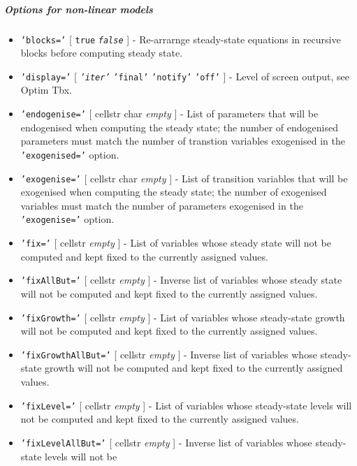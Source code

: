 \subparagraph{Options for non-linear
models}

\begin{itemize}
\item
  \texttt{'blocks='} {[} \texttt{true} \textbar{} \emph{\texttt{false}}
  {]} - Re-arrarnge steady-state equations in recursive blocks before
  computing steady state.
\item
  \texttt{'display='} {[} \emph{\texttt{'iter'}} \textbar{}
  \texttt{'final'} \textbar{} \texttt{'notify'} \textbar{}
  \texttt{'off'} {]} - Level of screen output, see Optim Tbx.
\item
  \texttt{'endogenise='} {[} cellstr \textbar{} char \textbar{}
  \emph{empty} {]} - List of parameters that will be endogenised when
  computing the steady state; the number of endogenised parameters must
  match the number of transtion variables exogenised in the
  \texttt{'exogenised='} option.
\item
  \texttt{'exogenise='} {[} cellstr \textbar{} char \textbar{}
  \emph{empty} {]} - List of transition variables that will be
  exogenised when computing the steady state; the number of exogenised
  variables must match the number of parameters exogenised in the
  \texttt{'exogenise='} option.
\item
  \texttt{'fix='} {[} cellstr \textbar{} \emph{empty} {]} - List of
  variables whose steady state will not be computed and kept fixed to
  the currently assigned values.
\item
  \texttt{'fixAllBut='} {[} cellstr \textbar{} \emph{empty} {]} -
  Inverse list of variables whose steady state will not be computed and
  kept fixed to the currently assigned values.
\item
  \texttt{'fixGrowth='} {[} cellstr \textbar{} \emph{empty} {]} - List
  of variables whose steady-state growth will not be computed and kept
  fixed to the currently assigned values.
\item
  \texttt{'fixGrowthAllBut='} {[} cellstr \textbar{} \emph{empty} {]} -
  Inverse list of variables whose steady-state growth will not be
  computed and kept fixed to the currently assigned values.
\item
  \texttt{'fixLevel='} {[} cellstr \textbar{} \emph{empty} {]} - List of
  variables whose steady-state levels will not be computed and kept
  fixed to the currently assigned values.
\item
  \texttt{'fixLevelAllBut='} {[} cellstr \textbar{} \emph{empty} {]} -
  Inverse list of variables whose steady-state levels will not be

\end{itemize}
